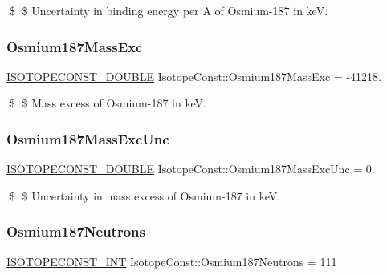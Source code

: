 \$ \$ Uncertainty in binding energy per A of Osmium-\/187 in keV. \mbox{\label{group___isotope_const-_osmium-_os187_ga60f4f00949d43e4b2bffa79c6a870f7e}} 
\subsubsection{\texorpdfstring{Osmium187\+Mass\+Exc}{Osmium187MassExc}}
{\footnotesize\ttfamily \mbox{\hyperlink{group___isotope_const-_macros_ga8f45a7272ce02c0b4c65c44636ed719a}{I\+S\+O\+T\+O\+P\+E\+C\+O\+N\+S\+T\+\_\+\+D\+O\+U\+B\+LE}} Isotope\+Const\+::\+Osmium187\+Mass\+Exc = -\/41218.}

\$ \$ Mass excess of Osmium-\/187 in keV. \mbox{\label{group___isotope_const-_osmium-_os187_ga1782c6cd16d9aba850f29fe096b84980}} 
\subsubsection{\texorpdfstring{Osmium187\+Mass\+Exc\+Unc}{Osmium187MassExcUnc}}
{\footnotesize\ttfamily \mbox{\hyperlink{group___isotope_const-_macros_ga8f45a7272ce02c0b4c65c44636ed719a}{I\+S\+O\+T\+O\+P\+E\+C\+O\+N\+S\+T\+\_\+\+D\+O\+U\+B\+LE}} Isotope\+Const\+::\+Osmium187\+Mass\+Exc\+Unc = 0.}

\$ \$ Uncertainty in mass excess of Osmium-\/187 in keV. \mbox{\label{group___isotope_const-_osmium-_os187_ga4c9eba8ad8cb292960c0f1d09232c9cd}} 
\subsubsection{\texorpdfstring{Osmium187\+Neutrons}{Osmium187Neutrons}}
{\footnotesize\ttfamily \mbox{\hyperlink{group___isotope_const-_macros_ga5f18360b3e99483a35c32d789e62621c}{I\+S\+O\+T\+O\+P\+E\+C\+O\+N\+S\+T\+\_\+\+I\+NT}} Isotope\+Const\+::\+Osmium187\+Neutrons = 111}


